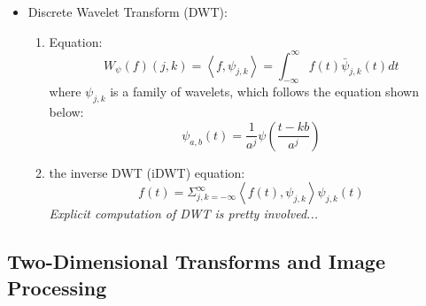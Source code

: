 \documentclass[11.5pt,a4paper]{article}
\begin{document}
\begin{itemize}
\begin{enumerate}
\begin{itemize}
        \end{itemize}
        \item The inverse CWT (iCWT) equation is the following:
        \begin{equation*}
            f(t) = \frac{1}{C_\psi}\int_{-\infty}^{\infty}\int_{-\infty}^{\infty} W_{\psi}(f)(a,b)\psi_{a,b}(t)\frac{1}{a^2}dadb
        \end{equation*}
        \textit{New wavelets can be formed through the convolution $\psi * \phi$ if $\phi$ is a bounded an integrable function}
    \end{enumerate}
    \item Discrete Wavelet Transform (DWT):
    \begin{enumerate}
        \item Equation:
        \begin{equation*}
            W_\psi(f)(j,k) = \left< f, \psi_{j,k} \right> = \int_{-\infty}^{\infty}f(t)\bar{\psi}_{j,k}(t)dt
        \end{equation*}
        where $\psi_{j,k}$ is a family of wavelets, which follows the equation shown below:
        \begin{equation*}
            \psi_{a, b}(t) = \frac{1}{a^j}\psi\left( \frac{t-kb}{a^j} \right)
        \end{equation*}
        \item the inverse DWT (iDWT) equation:
        \begin{equation*}
            f(t) = \Sigma^\infty_{j,k =-\infty} \left<f(t), \psi_{j,k}\right>\psi_{j,k}(t)
        \end{equation*}
        \textit{Explicit computation of DWT is pretty involved...}
    \end{enumerate}
\end{itemize}

\subsection*{Two-Dimensional Transforms and Image Processing}
\end{document}
